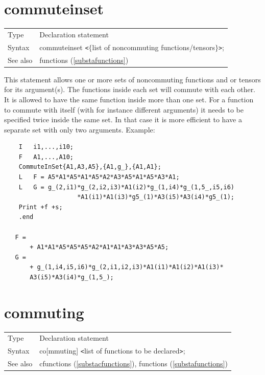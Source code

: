 \section{commuteinset}
\label{substacommuteinset}

\noindent \begin{tabular}{ll}
Type & Declaration statement\\
Syntax & commuteinset {\tt<}$\{$list of noncommuting functions/tensors$\}${\tt>}; \\
See also & functions (\ref{substafunctions})
\end{tabular} \vspace{4mm}

\noindent This statement allows one or more sets of 
noncommuting functions and or tensors for its argument(s). The functions 
inside each set will commute with each other. It is allowed to have the 
same function inside more than one set. For a function to commute with 
itself (with for instance different arguments) it needs to be specified 
twice inside the same set. In that case it is more efficient to have a 
separate set with only two arguments. Example:
\begin{verbatim}
    I   i1,...,i10;
    F   A1,...,A10;
    CommuteInSet{A1,A3,A5},{A1,g_},{A1,A1};
    L   F = A5*A1*A5*A1*A5*A2*A3*A5*A1*A5*A3*A1;
    L   G = g_(2,i1)*g_(2,i2,i3)*A1(i2)*g_(1,i4)*g_(1,5_,i5,i6)
                    *A1(i1)*A1(i3)*g5_(1)*A3(i5)*A3(i4)*g5_(1);
    Print +f +s;
    .end

   F =
       + A1*A1*A5*A5*A5*A2*A1*A1*A3*A3*A5*A5;
   G =
       + g_(1,i4,i5,i6)*g_(2,i1,i2,i3)*A1(i1)*A1(i2)*A1(i3)*
       A3(i5)*A3(i4)*g_(1,5_);
\end{verbatim}
\vspace{10mm}

 
\section{commuting}
\label{substacommuting}

\noindent \begin{tabular}{ll}
Type & Declaration statement\\
Syntax & co[mmuting] {\tt<}list of functions to be declared{\tt>}; \\
See also & cfunctions (\ref{substacfunctions}), functions (\ref{substafunctions})
\end{tabular} \vspace{4mm}

